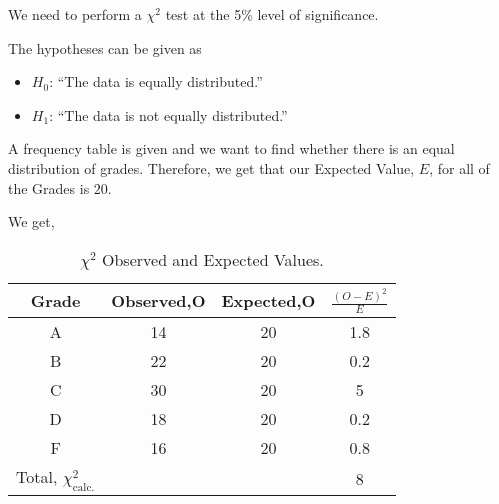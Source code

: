 %
%


\begin{subquestions}
	
\subquestion

We need to perform a $\chi^2$ test at the 5\% level of significance.

\begin{subsubquestions}
	
\subsubquestion

The hypotheses can be given as
\begin{itemize}
	\item $H_0$: ``The data is equally distributed.''
	
	\item $H_1$: ``The data is not equally distributed.''
\end{itemize}


\subsubquestion

A frequency table is given and we want to find whether there is an equal distribution of grades. Therefore, we get that our Expected Value, $E$, for all of the Grades is $20$.

We get,
\begin{table}[H]
	\centering
	\begin{tabular}{|c|c|c|c|}
		\hline
		Grade & Observed,O & Expected,O & $\frac{(O-E)^2}{E}$ \\
		\hline
		A & 14 & 20 & 1.8 \\
		B & 22 & 20 & 0.2 \\
		C & 30 & 20 & 5 \\ 
		D & 18 & 20 & 0.2 \\ 
		F & 16 & 20 & 0.8 \\
		\hline
		Total, $\chi^2_\text{calc.}$ & & & 8 \\
		\hline
	\end{tabular}
	\caption{\label{2016:q4:ChiTable} $\chi^2$ Observed and Expected Values.}
\end{table}
	

\end{subsubquestions}
\end{subquestions}
